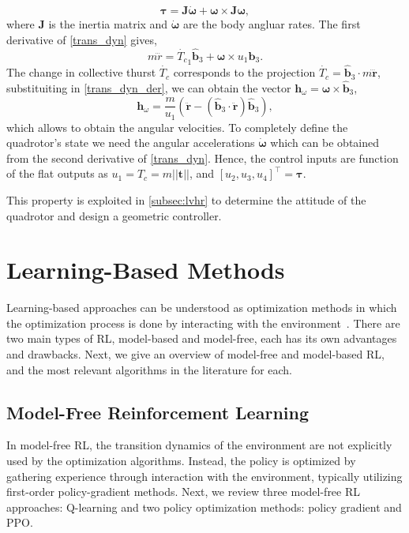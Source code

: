 \begin{equation}
    \boldsymbol{\tau} = \mathbf{J}\boldsymbol{\dot{\omega}}  + \boldsymbol{\omega} \times \mathbf{J} \boldsymbol{\omega}, 
\end{equation} 
where $\mathbf{J}$ is the inertia matrix and $\boldsymbol{\dot{\omega}}$ are the body angluar rates. The first derivative of \eqref{trans_dyn} gives,
\begin{equation}\label{trans_dyn_der}
    m \dddot{r} = \dot{T_c}_1 \hat{\mathbf{b}}_3 + \boldsymbol{\omega} \times u_1 \hat{\mathbf{b}}_3.
\end{equation}
The change in collective thurst $\dot{T_c}$ corresponds to the projection $\dot{T_c} = \hat{\mathbf{b}}_3 \cdot m \dddot{\mathbf{r}}$, substituiting in \eqref{trans_dyn_der},
we can obtain the vector $\mathbf{h}_{\omega} = \boldsymbol{\omega}\times \hat{\mathbf{b}}_3$,
\begin{equation}
    \mathbf{h}_{\omega} = \frac{m}{u_1} (\ddot{\mathbf{r}} - (\hat{\mathbf{b}}_3 \cdot \ddot{\mathbf{r}})\hat{\mathbf{b}}_3),
\end{equation}
which allows to obtain the angular velocities.
To completely define the quadrotor's state we need the angular accelerations $\dot{\boldsymbol{\omega}}$ which can be obtained from the second derivative of \eqref{trans_dyn}.
Hence, the control inputs are function of the flat outputs as $u_1 = T_c = m ||\mathbf{t}||$, and $[u_2, u_3, u_4]^\top = \boldsymbol{\tau}$.

This property is exploited in \autoref{subsec:lvhr} to determine the attitude of the quadrotor and design a geometric controller. 


\section{Learning-Based Methods}\label{sec:learned}
Learning-based approaches can be understood as optimization methods in which the optimization process is done by interacting with the environment~\cite{huang_model-based_2020}.
There are two main types of \ac{RL}, model-based and model-free, each has its own advantages and drawbacks.
Next, we give an overview of model-free and model-based \ac{RL}, and the most relevant algorithms in the literature for each.

\subsection{Model-Free Reinforcement Learning}
In model-free \ac{RL}, the transition dynamics of the environment are not explicitly used by the optimization algorithms. Instead, the policy is optimized by gathering experience through interaction with the environment, typically utilizing first-order policy-gradient methods.
Next, we review three model-free \ac{RL} approaches: Q-learning and two policy optimization methods: policy gradient and \ac{PPO}.

